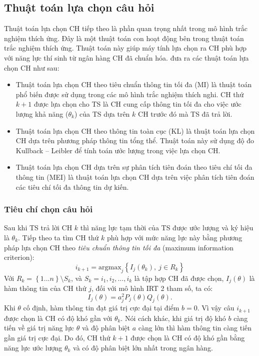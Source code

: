 \subsection{Thuật toán lựa chọn câu hỏi}
Thuật toán lựa chọn CH tiếp theo là phần quan trọng nhất trong mô hình trắc nghiệm thích ứng. Đây là một thuật toán con hoạt động bên trong thuật toán trắc nghiệm thích ứng. Thuật toán này giúp máy tính lựa chọn ra CH phù hợp với năng lực thí sinh từ ngân hàng CH đã chuẩn hóa. \textcite{tran2017ung} đưa ra các thuật toán lựa chọn CH như sau:
\begin{itemize}
	\item Thuật toán lựa chọn CH theo tiêu chuẩn thông tin tối đa (MI) là thuật toán phổ biến được sử dụng trong các mô hình trắc nghiệm thích nghi. CH thứ $k+1$ được lựa chọn cho TS là CH cung cấp thông tin tối đa cho việc ước lượng khả năng ($\theta_k$) của TS dựa trên $k$ CH trước đó mà TS đã trả lời.
	\item Thuật toán lựa chọn CH theo thông tin toàn cục (KL) là thuật toán lựa chọn CH dựa trên phương pháp thông tin tổng thể. Thuật toán này sử dụng độ đo Kullback – Leibler để tính toán ước lượng trong việc lựa chọn CH.
	\item Thuật toán lựa chọn CH dựa trên sự phân tích tiên đoán theo tiêu chí tối đa thông tin (MEI) là thuật toán lựa chọn CH dựa trên việc phân tích tiên đoán các tiêu chí tối đa thông tin dự kiến.
\end{itemize}\par

\subsubsection{Tiêu chí chọn câu hỏi}
Sau khi TS trả lời CH $k$ thì năng lực tạm thời của TS được ước lượng và ký hiệu là $\theta_{k}$. Tiếp theo ta tìm CH thứ $k$ phù hợp với mức năng lực này bằng phương pháp lựa chọn CH theo \textit{tiêu chuẩn thông tin tối đa} (maximum information criterion):
$$i_{k+1}=\mathrm{argmax}_j\left\{I_j\left(\theta_k\right),~j\in R_k\right\}$$
Với $R_k=\left\{1...n\right\}\setminus S_k$, và $S_k={i_1, i_2, ..., i_k}$ là tập hợp CH đã được chọn, $I_j(\theta)$ là hàm thông tin của CH thứ $j$, đối với mô hình IRT 2 tham số, ta có:
$$I_j(\theta)=a_j^2P_j(\theta)Q_j(\theta).$$
Khi $\theta$ cố định, hàm thông tin đạt giá trị cực đại tại điểm $b=0$. Vì vậy câu $i_{k+1}$ được chọn là CH có độ khó gần với $\theta_k$. Nói cách khác, khi giá trị độ khó $b$ càng tiến về giá trị năng lực $\theta$ và độ phân biệt $a$ càng lớn thì hàm thông tin càng tiến gần giá trị cực đại. Do đó, CH thứ $k+1$ được chọn là CH có độ khó gần bằng năng lực ước lượng $\theta_k$ và có độ phân biệt lớn nhất trong ngân hàng.\par

